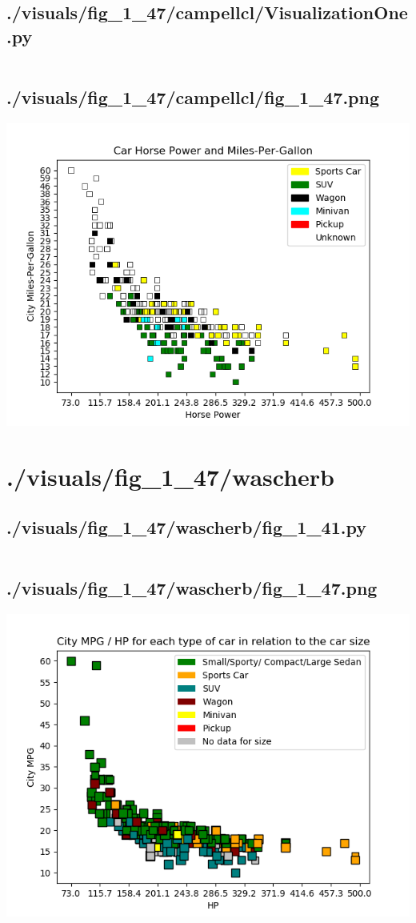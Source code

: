 \documentclass{report}
\begin{document}
    \subsection{./visuals/fig\_1\_47/campellcl/VisualizationOne.py}
    \inputminted[breaklines=true]{python}{.././visuals/fig_1_47/campellcl/VisualizationOne.py}
    \subsection{./visuals/fig\_1\_47/campellcl/fig\_1\_47.png}
    \includegraphics[width=\textwidth]{.././visuals/fig_1_47/campellcl/fig_1_47.png}
    \pagebreak
    \section{./visuals/fig\_1\_47/wascherb}
    \subsection{./visuals/fig\_1\_47/wascherb/fig\_1\_41.py}
    \inputminted[breaklines=true]{python}{.././visuals/fig_1_47/wascherb/fig_1_41.py}
    \subsection{./visuals/fig\_1\_47/wascherb/fig\_1\_47.png}
    \includegraphics[width=\textwidth]{.././visuals/fig_1_47/wascherb/fig_1_47.png}
    \pagebreak
\end{document}
